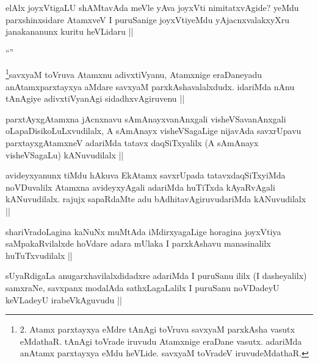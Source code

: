 \begin{artha}
elAlx joyxVtigaLU shAMtavAda meVle yAva joyxVti nimitatxvAgide? yeMdu parxshinxsidare AtamxveV I puruSanige joyxVtiyeMdu yAjacnxvalakxyXru janakananunx kuritu heVLidaru ||
\end{artha}

\begin{artha}
``\stext''
\end{artha}

\begin{artha}
\footnote{2. Atamx parxtayxya eMdre tAnAgi toVruva savxyaM parxkAsha vasutx eMdathaR. tAnAgi toVrade iruvudu Atamxnige eraDane vasutx. adariMda anAtamx parxtayxya eMdu heVLide. savxyaM toVradeV iruvudeMdathaR.}savxyaM toVruva Atamxnu adivxtiVyanu, Atamxnige eraDaneyadu \footnotemark[2]anAtamxparxtayxya aMdare savxyaM parxkAshavalalxdudx. idariMda nAnu tAnAgiye adivxtiVyanAgi sidadhxvAgiruvenu ||
\end{artha}

\begin{artha}
parxtAyxgAtamxna jAcnxnavu sAmAnayxvanAnxgali visheVSavanAnxgali oLapaDisikoLuLxvudilalx, A sAmAnayx visheVSagaLige nijavAda savxrUpavu parxtayxgAtamxneV adariMda tatavx daqSiTxyalilx (A sAmAnayx visheVSagaLu) kANuvudilalx ||
\end{artha}

\begin{artha}
avideyxyanunx tiMdu hAkuva EkAtamx savxrUpada tatavxdaqSiTxyiMda noVDuvalilx Atamxna avideyxyAgali adariMda huTiTxda kAyaRvAgali kANuvudilalx. rajujx sapaRdaMte adu bAdhitavAgiruvudariMda kANuvudilalx ||
\end{artha}

\begin{artha}
shariVradoLagina kaNuNx muMtAda iMdirxyagaLige horagina joyxVtiya saMpakaRvilalxde hoVdare adara mUlaka I parxkAshavu manasinalilx huTuTxvudilalx ||
\end{artha}

\begin{artha}
sUyaRdigaLa anugarxhavilalxdidadxre adariMda I puruSanu ililx (I dasheyalilx) samxraNe, savxpanx modalAda sathxLagaLalilx I puruSanu noVDadeyU keVLadeyU irabeVkAguvudu ||
\end{artha}

